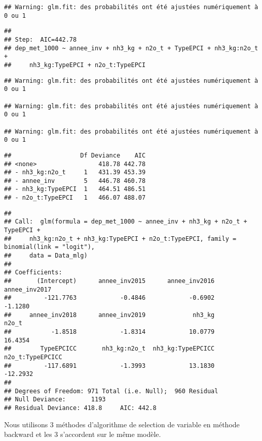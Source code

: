 \documentclass[
]{article}
\begin{document}
\begin{verbatim}
## Warning: glm.fit: des probabilités ont été ajustées numériquement à 0 ou 1
\end{verbatim}

\begin{verbatim}
## 
## Step:  AIC=442.78
## dep_met_1000 ~ annee_inv + nh3_kg + n2o_t + TypeEPCI + nh3_kg:n2o_t + 
##     nh3_kg:TypeEPCI + n2o_t:TypeEPCI
\end{verbatim}

\begin{verbatim}
## Warning: glm.fit: des probabilités ont été ajustées numériquement à 0 ou 1

## Warning: glm.fit: des probabilités ont été ajustées numériquement à 0 ou 1

## Warning: glm.fit: des probabilités ont été ajustées numériquement à 0 ou 1
\end{verbatim}

\begin{verbatim}
##                   Df Deviance    AIC
## <none>                 418.78 442.78
## - nh3_kg:n2o_t     1   431.39 453.39
## - annee_inv        5   446.78 460.78
## - nh3_kg:TypeEPCI  1   464.51 486.51
## - n2o_t:TypeEPCI   1   466.07 488.07
\end{verbatim}

\begin{verbatim}
## 
## Call:  glm(formula = dep_met_1000 ~ annee_inv + nh3_kg + n2o_t + TypeEPCI + 
##     nh3_kg:n2o_t + nh3_kg:TypeEPCI + n2o_t:TypeEPCI, family = binomial(link = "logit"), 
##     data = Data_mlg)
## 
## Coefficients:
##       (Intercept)      annee_inv2015      annee_inv2016      annee_inv2017  
##         -121.7763            -0.4846            -0.6902            -1.1280  
##     annee_inv2018      annee_inv2019             nh3_kg              n2o_t  
##           -1.8518            -1.8314            10.0779            16.4354  
##        TypeEPCICC       nh3_kg:n2o_t  nh3_kg:TypeEPCICC   n2o_t:TypeEPCICC  
##         -117.6891            -1.3993            13.1830           -12.2932  
## 
## Degrees of Freedom: 971 Total (i.e. Null);  960 Residual
## Null Deviance:       1193 
## Residual Deviance: 418.8     AIC: 442.8
\end{verbatim}

Nous utilisons 3 méthodes d'algorithme de selection de variable en
méthode backward et les 3 s'accordent sur le même modèle.
\end{document}

